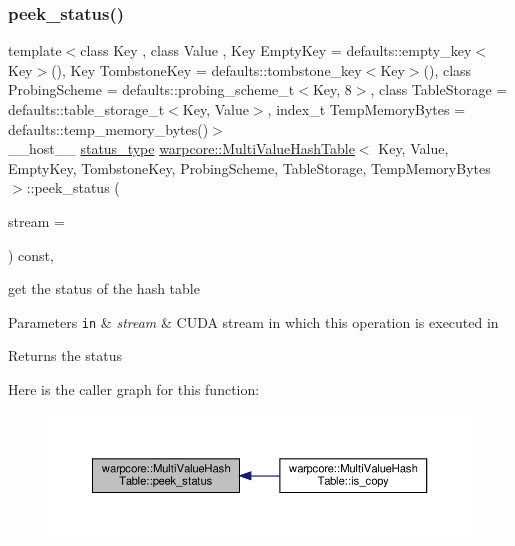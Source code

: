 \subsubsection{\texorpdfstring{peek\+\_\+status()}{peek\_status()}}
{\footnotesize\ttfamily template$<$class Key , class Value , Key Empty\+Key = defaults\+::empty\+\_\+key$<$\+Key$>$(), Key Tombstone\+Key = defaults\+::tombstone\+\_\+key$<$\+Key$>$(), class Probing\+Scheme  = defaults\+::probing\+\_\+scheme\+\_\+t$<$\+Key, 8$>$, class Table\+Storage  = defaults\+::table\+\_\+storage\+\_\+t$<$\+Key, Value$>$, index\+\_\+t Temp\+Memory\+Bytes = defaults\+::temp\+\_\+memory\+\_\+bytes()$>$ \\
\+\_\+\+\_\+host\+\_\+\+\_\+ \hyperlink{classwarpcore_1_1Status}{status\+\_\+type} \hyperlink{classwarpcore_1_1MultiValueHashTable}{warpcore\+::\+Multi\+Value\+Hash\+Table}$<$ Key, Value, Empty\+Key, Tombstone\+Key, Probing\+Scheme, Table\+Storage, Temp\+Memory\+Bytes $>$\+::peek\+\_\+status (\begin{DoxyParamCaption}\item[{const cuda\+Stream\+\_\+t}]{stream = {} }\end{DoxyParamCaption}) const\hspace{0.3cm}{\ttfamily [inline]}, {\ttfamily [noexcept]}}



get the status of the hash table 


\begin{DoxyParams}[1]{Parameters}
\mbox{\tt in}  & {\em stream} & C\+U\+DA stream in which this operation is executed in \\
\hline
\end{DoxyParams}
\begin{DoxyReturn}{Returns}
the status 
\end{DoxyReturn}
Here is the caller graph for this function\+:
\nopagebreak
\begin{figure}[H]
\begin{center}
\leavevmode
\includegraphics[width=350pt]{classwarpcore_1_1MultiValueHashTable_a239a45feb31e995163b4e22ec9dab446_icgraph}
\end{center}
\end{figure}
\mbox{\label{classwarpcore_1_1MultiValueHashTable_a2b1fca3402bf4df60eebe04e33b28d02}} 
